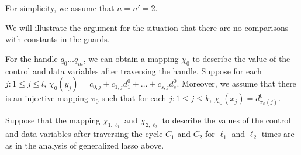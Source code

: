 \documentclass[runningheads,a4paper]{llncs}
\begin{document}
For simplicity, we assume that $n = n' = 2$.

We will illustrate the argument for the situation that there are no comparisons with constants in the guards.

For the handle $q_0 \dots q_m$, we can obtain a mapping $\chi_0$ to describe the value of the control and data variables after traversing the handle. Suppose for each $j: 1 \le j \le l$,  $\chi_0(y_j) = c_{0,j} + c_{1,j} d^0_1 + \dots + c_{s,j} d^0_s$. Moreover, we assume that there is an injective mapping $\pi_0$ such that for each $j: 1 \le j \le k$, $\chi_0(x_j) = d^0_{\pi_0(j)}$.

Suppose that the mapping $\chi_{1,\ell_1}$ and $\chi_{2,\ell_2}$ to describe the values of the control and data variables after traversing the cycle $C_1$ and $C_2$ for $\ell_1$ and $\ell_2$ times are as in the analysis of generalized lasso above.
\end{document}
